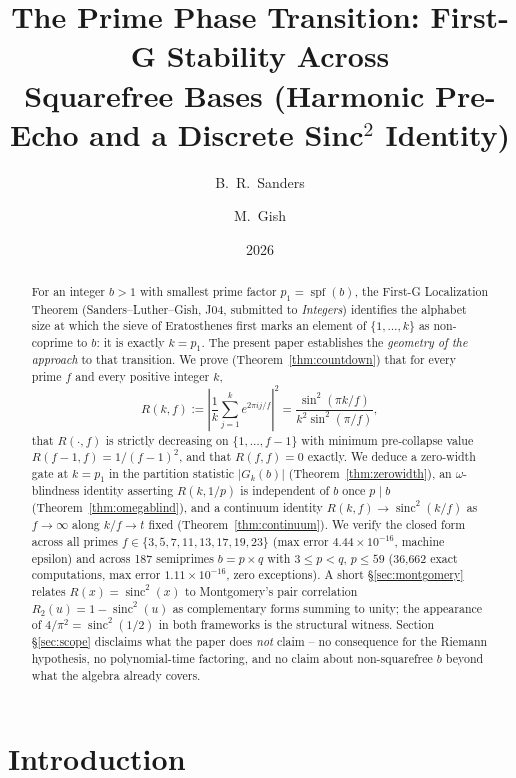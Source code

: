 \documentclass[11pt,reqno]{amsart}
\title[The Prime Phase Transition]%
{The Prime Phase Transition: First-G Stability Across\\
 Squarefree Bases (Harmonic Pre-Echo and a Discrete Sinc${}^{2}$ Identity)}
\author{B.~R.~Sanders}
\author{M.~Gish}
\date{2026}
\theoremstyle{plain}
\theoremstyle{definition}
\theoremstyle{remark}
\DeclareMathOperator{\spf}{spf}
\DeclareMathOperator{\sinc}{sinc}
\begin{document}
\begin{abstract}
For an integer $b > 1$ with smallest prime factor $p_1 = \spf(b)$,
the First-G Localization Theorem (Sanders--Luther--Gish, J04, submitted
to \emph{Integers}) identifies the alphabet size at which the sieve of
Eratosthenes first marks an element of $\{1, \ldots, k\}$ as
non-coprime to $b$: it is exactly $k = p_1$. The present paper
establishes the \emph{geometry of the approach} to that transition.
We prove (Theorem~\ref{thm:countdown}) that for every prime $f$ and
every positive integer $k$,
\[
  R(k, f) := \left|\frac{1}{k}\sum_{j=1}^{k} e^{2\pi i j / f}\right|^2
  = \frac{\sin^2(\pi k / f)}{k^2 \sin^2(\pi / f)},
\]
that $R(\cdot, f)$ is strictly decreasing on $\{1, \ldots, f-1\}$
with minimum pre-collapse value $R(f-1, f) = 1/(f-1)^2$, and that
$R(f, f) = 0$ exactly. We deduce a zero-width gate at $k = p_1$ in
the partition statistic $|G_k(b)|$ (Theorem~\ref{thm:zerowidth}), an
$\omega$-blindness identity asserting $R(k, 1/p)$ is independent of
$b$ once $p \mid b$ (Theorem~\ref{thm:omegablind}), and a continuum
identity $R(k, f) \to \sinc^2(k/f)$ as $f \to \infty$ along $k/f \to t$
fixed (Theorem~\ref{thm:continuum}). We verify the closed form across
all primes $f \in \{3, 5, 7, 11, 13, 17, 19, 23\}$ (max error
$4.44 \times 10^{-16}$, machine epsilon) and across 187 semiprimes
$b = p \times q$ with $3 \le p < q$, $p \le 59$ (36{,}662 exact
computations, max error $1.11 \times 10^{-16}$, zero exceptions). A
short \S\ref{sec:montgomery} relates $R(x) = \sinc^2(x)$ to
Montgomery's pair correlation $R_2(u) = 1 - \sinc^2(u)$ as
complementary forms summing to unity; the appearance of $4/\pi^2 =
\sinc^2(1/2)$ in both frameworks is the structural witness. Section
\S\ref{sec:scope} disclaims what the paper does \emph{not} claim --
no consequence for the Riemann hypothesis, no polynomial-time
factoring, and no claim about non-squarefree $b$ beyond what the
algebra already covers.
\end{abstract}

\maketitle

\section{Introduction}
\label{sec:intro}
\end{document}
